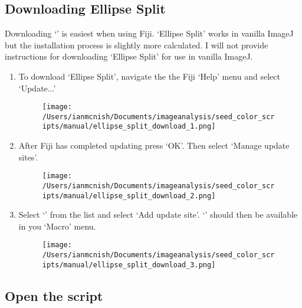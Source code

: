 \documentclass[12pt]{article}
\begin{document}
\subsection{Downloading Ellipse Split}\label{sec:ellipse_split}

\noindent Downloading `' is easiest when using Fiji. `Ellipse Split' works in vanilla ImageJ but the installation process is slightly more calculated. I will not provide instructions for downloading `Ellipse Split' for use in vanilla ImageJ. 

\begin{enumerate}

\item To download `Ellipse Split', navigate the the Fiji `Help' menu and select `Update...'\\

\begin{figure}[H]
	\centering
	\texttt{[image: /Users/ianmcnish/Documents/imageanalysis/seed\_color\_scripts/manual/ellipse\_split\_download\_1.png]}
	\label{fig:ellipse_split_download_1}
\end{figure}

\item After Fiji has completed updating press `OK'. Then select `Manage update sites'.\\

\begin{figure}[H]
	\centering
	\texttt{[image: /Users/ianmcnish/Documents/imageanalysis/seed\_color\_scripts/manual/ellipse\_split\_download\_2.png]}
	\label{fig:ellipse_split_download_2}
\end{figure}

\item Select `' from the list and select `Add update site'. `' should then be available in you `Macro' menu.\\

\begin{figure}[H]
	\centering
	\texttt{[image: /Users/ianmcnish/Documents/imageanalysis/seed\_color\_scripts/manual/ellipse\_split\_download\_3.png]}
	\label{fig:ellipse_split_download_3}
\end{figure}

\end{enumerate}

\subsection{Open the script}\label{sec:open_script}
\end{document}

